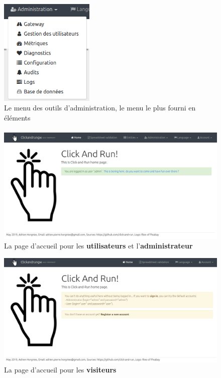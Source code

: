 \begin{figure}[ht]
    \centering
    \includegraphics[width=0.4\textwidth]{images/screenshot/menu-admin.png}
    \caption{Le menu des outils d'administration, le menu le plus fourni en éléments}
    \label{fig:menu-admin}
\end{figure}
\paragraph{}

\begin{figure}[ht]
    \centering
    \includegraphics[width=1\textwidth]{images/screenshot/home-page-logged.png}
    \caption{La page d'accueil pour les \textbf{utilisateurs} et l'\textbf{administrateur}}
    \label{fig:home-logged}
\end{figure}

\begin{figure}[ht]
    \centering
    \includegraphics[width=1\textwidth]{images/screenshot/home-page-anon.png}
    \caption{La page d'accueil pour les \textbf{visiteurs}}
    \label{fig:home-anon}
\end{figure}

